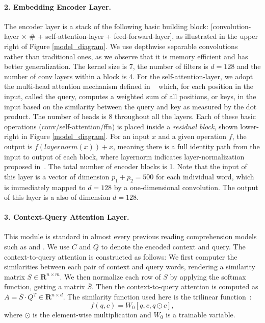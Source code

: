 \documentclass{article} \usepackage{iclr2018_conference,times}
\begin{document}
\paragraph{2. Embedding Encoder Layer.} The encoder layer is a stack of the following basic building block: 
[convolution-layer $\times$ \# + self-attention-layer + feed-forward-layer],
as illustrated in the upper right of Figure \ref{model_diagram}. We use depthwise separable convolutions ~\citep{Chollet16a} ~\citep{kaiser2017depthwise} rather than traditional ones, as we observe that it is memory efficient and has better generalization. The kernel size is 7, the number of filters is $d=128$ and the number of conv layers within a block is 4.
For the self-attention-layer, we adopt the multi-head attention mechanism defined in ~\citep{VaswaniSPUJGKP17} which, for each position in the input, called the query, computes a weighted sum of all positions, or keys, in the input based on the similarity between the query and key as measured by the dot product. The number of heads is 8 throughout all the layers. 
 Each of these basic operations (conv/self-attention/ffn) is placed inside a \textit{residual block}, shown lower-right in Figure \ref{model_diagram}.  For an input $x$ and a given operation $f$, the output is $f(layernorm(x)) + x$, meaning there is a full identity path from the input to output of each block, where layernorm indicates layer-normalization proposed in~\citep{BaKH16}. The total number of encoder blocks is 1. Note that the input of this layer is a vector of dimension $p_1+p_2=500$ for each individual word, which is immediately mapped to $d=128$ by a one-dimensional convolution. The output of this layer is a also of dimension $d=128$.

\paragraph{3. Context-Query Attention Layer.} This module is standard in almost every previous reading comprehension models such as \cite{WeissenbornWS17} and \cite{ChenFWB17}. We use $C$ and $Q$ to denote the encoded context and query.  The context-to-query attention is constructed as follows: We first computer the similarities between each pair of context and query words, rendering a similarity matrix 
$S\in\mathbf{R}^{n \times m}$. We then normalize each row of $S$ by applying the softmax function, getting a matrix $\overline{S}$. Then the context-to-query attention is computed as 
$A = \overline{S} \cdot Q^T \in \mathbf{R}^{n\times d}$. The similarity function used here is the trilinear function~\citep{SeoKFH16}:
$$f(q, c) = W_0[q, c, q\odot c],$$
where $\odot$ is the element-wise multiplication and $W_0$ is a trainable variable.
\end{document}
